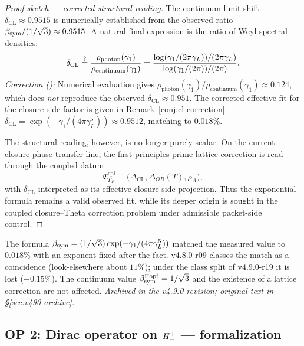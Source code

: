 \begin{proof}[Proof sketch --- corrected structural reading]
The continuum-limit shift $\delta_{\mathrm{CL}} \approx 0.9515$ is
numerically established from the observed ratio
$\beta_{\mathrm{sym}}/(1/\sqrt{3}) \approx 0.9515$.
A natural final expression is the ratio of Weyl spectral densities:
\[
 \delta_{\mathrm{CL}}
 \stackrel{?}{=}
 \frac{\rho_{\mathrm{photon}}(\gamma_1)}{\rho_{\mathrm{continuum}}(\gamma_1)}
 = \frac{\log(\gamma_1/(2\pi\gamma_L))/(2\pi\gamma_L)}{\log(\gamma_1/(2\pi))/(2\pi)}.
\]
\emph{Correction ():} Numerical evaluation gives
$\rho_{\mathrm{photon}}(\gamma_1)/\rho_{\mathrm{continuum}}(\gamma_1) \approx 0.124$,
which does \emph{not} reproduce the observed $\delta_{\mathrm{CL}} \approx 0.951$.
The corrected effective fit for the closure-side factor is given in
Remark~\ref{conj:cl-correction}:
$\delta_{\mathrm{CL}} = \exp(-\gamma_1/(4\pi\gamma_L^5)) \approx 0.9512$,
matching to $0.018\%$.

The structural reading, however, is no longer purely scalar. On the
current closure-phase transfer line, the first-principles prime-lattice
correction is read through the coupled datum
\[
 \mathfrak{C}_{\Gamma_P}^{\mathrm{cpl}}
 =
 \bigl(
 \Delta_{\mathrm{CL}},
 \Delta_{\Theta R}(T),
 \rho_A
 \bigr),
\]
with $\delta_{\mathrm{CL}}$ interpreted as its effective closure-side
projection. Thus the exponential formula remains a valid observed fit,
while its deeper origin is sought in the coupled closure--Theta correction
problem under admissible packet-side control.
\end{proof}

\begin{remark}\label{conj:cl-correction}
The formula \(\beta_{\mathrm{sym}}=(1/\sqrt3)\exp(-\gamma_1/(4\pi\gamma_L^5))\) matched the measured value to \(0.018\%\) with an exponent fixed after the fact.  v4.8.0-r09 classes the match as a coincidence (look-elsewhere about \(11\%\)); under the class split of v4.9.0-r19 it is lost (\(-0.15\%\)).  The continuum value \(\beta_{\mathrm{sym}}^{\rm Hopf}=1/\sqrt3\) and the existence of a lattice correction are not affected.
\emph{Archived in the v4.9.0 revision; original text in \S\ref{sec:v490-archive}.}
\end{remark}


\subsection{OP 2: Dirac operator on $H^+_-$ --- formalization}
\label{sec:op2}

